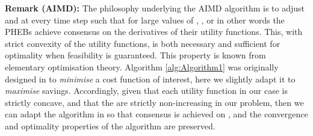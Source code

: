 \documentclass[journal]{IEEEtran}
\begin{document}
\noindent \textbf{Remark (AIMD):} The philosophy underlying the AIMD algorithm is to adjust  and  at every time step  such that for large values of , , or in other words the PHEBs achieve consensus on the derivatives of their utility functions. This, with strict convexity of the utility functions, is both necessary and sufficient for optimality when feasibility is guaranteed. This property is known from elementary optimisation theory. Algorithm \ref{alg:Algorithm1} was originally designed in \cite{wirth2014nonhomogeneous} to \textit{minimise} a cost function of interest, here we slightly adapt it to \textit{maximise}  savings. Accordingly, given that each utility function  in our case is strictly concave, and that the  are strictly non-increasing in our problem, then we can adapt the algorithm in \cite{wirth2014nonhomogeneous} so that consensus is achieved on , and the convergence and optimality properties of the algorithm are preserved.\newline
\end{document}
